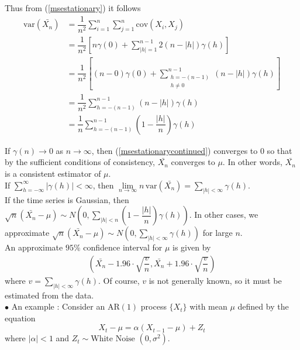 \documentclass[11pt, a4paper]{article}
\numberwithin{equation}{section}
\theoremstyle{definition}
\begin{document}
Thus from (\ref{msestationary}) it follows
\begin{align}\label{msestationarycontinued}
\text{var}(\bar{X_n}) &= \dfrac{1}{n^2} \sum \limits_{i = 1}^{n} \sum \limits_{j = 1}^{n} \text{cov}(X_i, X_j) \nonumber \\[0.25em]
&= \dfrac{1}{n^2} \left[ n\gamma(0) + \sum \limits_{|h| = 1}^{n-1} 2(n - |h|) \gamma(h) \right] \nonumber \\[0.25em]
&= \dfrac{1}{n^2} \left[ (n - 0)\gamma(0) + \sum \limits_{\substack{h = -(n-1) \\[4pt] h \neq 0}}^{n-1} (n - |h|) \gamma(h) \right] \nonumber \\[0.25em]
&= \dfrac{1}{n^2} \sum \limits_{h = -(n-1)}^{n-1} (n - |h|) \gamma(h) \nonumber \\[0.25em]
&= \dfrac{1}{n} \sum \limits_{h = -(n-1)}^{n-1} \left(1 - \dfrac{|h|}{n}\right) \gamma(h)
\end{align}

If $\gamma(n) \rightarrow 0$ as $n \rightarrow \infty$, then  (\ref{msestationarycontinued}) converges to $0$ so that by the sufficient conditions of consistency, $\bar{X_n}$ converges to $\mu$. In other words, $\bar{X_n}$ is a consistent estimator of $\mu$. \\[0.25em]

If $\sum \limits_{h = -\infty}^{\infty} |\gamma(h)| < \infty$, then $\lim \limits_{n \rightarrow \infty} n \, \text{var}(\bar{X_n}) = \sum \limits_{|h| < \infty} \gamma(h)$. \\[0.25em]

If the time series is Gaussian, then $\sqrt{n}\left( \bar{X_n} - \mu \right) \sim N \left( 0, \sum \limits_{|h| < n} \left(1 - \dfrac{|h|}{n}\right) \gamma(h) \right)$. In other cases, we approximate $\sqrt{n}\left( \bar{X_n} - \mu \right) \sim N \left( 0,  \sum \limits_{|h| < \infty} \gamma(h) \right)$ for large $n$. \\[0.25em]

An approximate $95\%$ confidence interval for $\mu$ is given by
\begin{align*}
\left( \bar{X_n} - 1.96 \cdot \sqrt{\dfrac{v}{n}}, \bar{X_n} + 1.96 \cdot \sqrt{\dfrac{v}{n}} \right)
\end{align*}
where $v = \sum \limits_{|h| < \infty} \gamma(h)$. Of course, $v$ is not generally known, so it must be estimated from the data. \\[0.25em]

$\bullet$ An example : Consider an AR$(1)$ process $\{X_t\}$ with mean $\mu$ defined by the equation
\begin{equation*}
X_t - \mu = \alpha \left( X_{t-1} - \mu \right) + Z_t
\end{equation*}
where $|\alpha| < 1$ and $Z_t \sim \text{White Noise } (0, \sigma^2)$. \\[0.25em]
\end{document}
